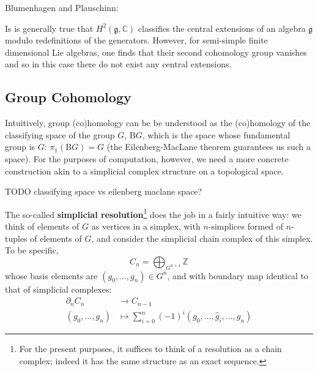 \documentclass{report}
\begin{document}
Blumenhagen and Plauschinn: 

\begin{quotebox}
Is is generally true that $ H^2(\mathfrak{g},\mathbb{C}) $ classifies the central 
extensions of an algebra $ \mathfrak{g} $ modulo redefinitions of the generators. 
However, for semi-simple finite dimensional Lie algebras, one finds that their
second cohomology group vanishes and so in this case there do not exist any
central extensions.
\end{quotebox}

\subsection{Group Cohomology}
Intuitively, group (co)homology can be be understood as
the (co)homology of the classifying space of the group $ G $, $ \mathrm{B}G $,
which is the space whose fundamental group is $ G $: $ \pi_1(\text{B}G) = G $
(the Eilenberg-MacLane theorem guarantees us such a space). 
For the purposes of
computation, however, we need a more concrete construction akin to a simplicial
complex structure on a topological space. 

TODO classifying space vs eilenberg maclane space?

 The so-called \textbf{simplicial 
resolution}\footnote{For the present purposes, it suffices to think of a 
resolution as a chain complex; indeed it has the same structure as an exact 
sequence.} does the job in a fairly intuitive way: we think of elements of $ G $ 
as vertices in a simplex, with $ n $-simplices formed of $ n $-tuples of elements 
of $ G $, and consider the simplicial chain complex of this simplex. To be 
specific, 
\begin{equation*}
	C_n = \bigoplus_{G^{n+1}} \mathbb{Z}
\end{equation*}
whose basis elements are $ (g_0, \dots, g_n)\in G^n $, and with boundary map 
identical to that of simplicial complexes: 
\begin{align*}
	\partial_n C_n &\longrightarrow C_{n-1} \\ 
	(g_0, \dots, g_n) &\longmapsto \sum_{i = 0}^{n}(-1)^i (g_0, \dots, \hat{g}_i, \dots,g_n)
\end{align*}
\end{document}
